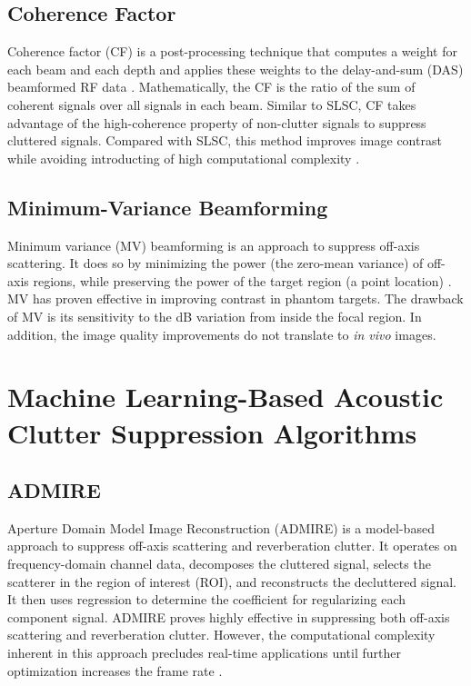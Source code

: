     \subsection{Coherence Factor}
      Coherence factor (CF) is a post-processing technique that computes a weight for each beam and each depth and applies these weights to the delay-and-sum (DAS) beamformed RF data \cite{mallart1994adaptive, hollman1999coherence}. Mathematically, the CF is the ratio of the sum of coherent signals over all signals in each beam. Similar to SLSC, CF takes advantage of the high-coherence property of non-clutter signals to suppress cluttered signals. Compared with SLSC, this method improves image contrast while avoiding introducting of high computational complexity \cite{dei_thesis}. %

    \subsection{Minimum-Variance Beamforming}
      Minimum variance (MV) beamforming is an approach to suppress off-axis scattering. It does so by minimizing the power (the zero-mean variance) of off-axis regions, while preserving the power of the target region (a point location) \cite{synnevag2007adaptive, holfort2009broadband}. MV has proven effective in improving contrast in phantom targets. The drawback of MV is its sensitivity to the dB variation from inside the focal region. In addition, the image quality improvements do not translate to \textit{in vivo} images. %

\section{Machine Learning-Based Acoustic Clutter Suppression Algorithms}

\subsection{ADMIRE}

Aperture Domain Model Image Reconstruction (ADMIRE) is a model-based approach to suppress off-axis scattering and reverberation clutter. It operates on frequency-domain channel data, decomposes the cluttered signal, selects the scatterer in the region of interest (ROI), and reconstructs the decluttered signal. It then uses regression to determine the coefficient for regularizing each component signal. ADMIRE proves highly effective in suppressing both off-axis scattering and reverberation clutter. However, the computational complexity inherent in this approach precludes real-time applications until further optimization increases the frame rate \cite{dei_thesis, admire2015}.


